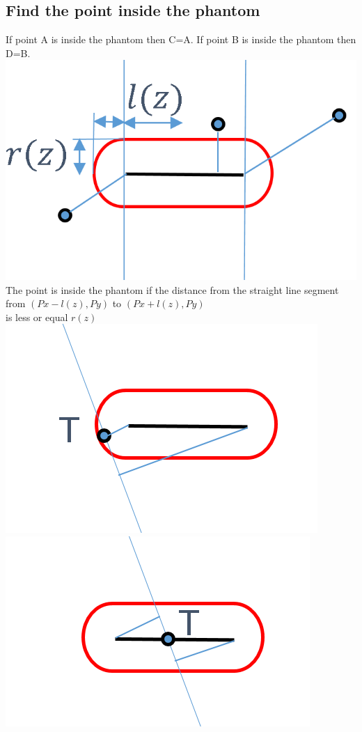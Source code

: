 \documentclass[12pt]{article}
\begin{document}
\subsection{Find the point inside the phantom}
If point A is inside the phantom then C=A.
If point B is inside the phantom then D=B.
\includegraphics[scale=0.5]{pic06.png}\\
The point is inside the phantom if the distance from the straight line segment \\
from $(Px-l(z),Py)$  to  $(Px+l(z),Py)$ \\
is less or equal $r(z)$ \\
\includegraphics[scale=0.5]{pic07a.png}\\
\includegraphics[scale=0.5]{pic07b.png}\\
\end{document}
